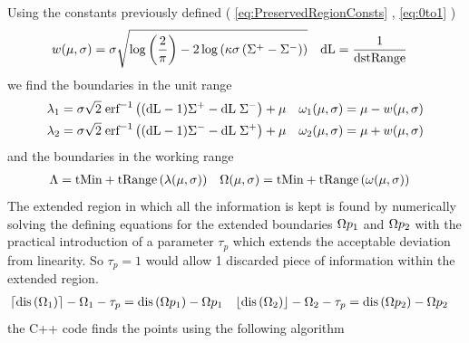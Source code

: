 Using the constants previously defined ( \ref{eq:PreservedRegionConsts} , \ref{eq:0to1} )
\begin{align*}
  w(\mu,\sigma)  & =  \sigma  \sqrt{ \log \left(\frac{2}{\pi } \right) -2 \log \left(\kappa \sigma  \left(\Sigma^+-\Sigma^-\right)\right) } &
  \text{dL} &= \frac{1}{\text{dstRange}} 
\end{align*}
we find the boundaries in the unit range 
\begin{equation}
\begin{aligned}
\lambda_1 &= \sigma \sqrt{2} \; \text{erf}^{-1}\left((\text{dL}-1) \Sigma^+-\text{dL} \; \Sigma^-\right)+\mu  &       
\omega_1(\mu,\sigma) &= \mu - w(\mu,\sigma)  \\     
\lambda_2 &= \sigma \sqrt{2} \; \text{erf}^{-1}\left((\text{dL}-1) \Sigma^- -\text{dL} \; \Sigma^+ \right)+\mu &
\omega_2(\mu,\sigma) &= \mu + w(\mu,\sigma) 
\end{aligned}
\end{equation}
and the boundaries in the working range
\begin{equation}\label{eq:DiscardedRegionBounds}
\begin{aligned}
\Lambda &= \text{tMin} + \text{tRange} \left( \lambda(\mu,\sigma) \right) & 
\Omega(\mu,\sigma) &= \text{tMin} + \text{tRange}\left( \omega(\mu,\sigma) \right) 
\end{aligned}
\end{equation}
The extended region in which all the information is kept is found by numerically solving the defining equations for the  extended boundaries $\Omega p_1$ and $\Omega p_2$ with the practical introduction of a parameter $ \tau_{p} $ which extends the acceptable deviation from linearity. So $ \tau_{p} =1$ would allow 1 discarded piece of information within the extended region.
\begin{equation}
\begin{aligned}
\left\lceil\text{dis}\left(\Omega _1\right)\right\rceil-\Omega _1 - \tau_{p} & =\text{dis}\left(\Omega p _1\right)- \Omega p _1 &
\left\lfloor\text{dis}\left(\Omega _2\right)\right\rfloor-\Omega _2 - \tau_{p} & =\text{dis}\left(\Omega p _2\right)- \Omega p _2 
\end{aligned}
\end{equation}
the C++ code finds the points using the following algorithm


